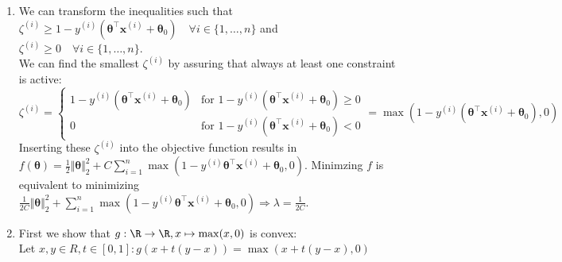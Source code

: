 \begin{enumerate}
\item We can transform the inequalities such that \\
$\zeta^{(i)} \geq 1 - y^{(i)}\left( \bm{\theta}^\top\mathbf{x}^{(i)} + \bm{\theta}_0\right) \quad \forall i \in \{1,\dots,n\}$ and $\zeta^{(i)} \geq 0 \quad \forall i \in \{1, \dots, n\}.$\\
We can find the smallest $\zeta^{(i)}$ by assuring that always at least one constraint is active:\\
$\zeta^{(i)} = \begin{cases} 1 - y^{(i)}\left( \bm{\theta}^\top\mathbf{x}^{(i)} + \bm{\theta}_0\right) & \text{for } 1 - y^{(i)}\left( \bm{\theta}^\top\mathbf{x}^{(i)} + \bm{\theta}_0\right) \geq 0 \\
0 & \text{for } 1 - y^{(i)}\left( \bm{\theta}^\top\mathbf{x}^{(i)} + \bm{\theta}_0\right) < 0
\end{cases} = \max(1 - y^{(i)}\left( \bm{\theta}^\top\mathbf{x}^{(i)} + \bm{\theta}_0\right), 0)$ \\
Inserting these $\zeta^{(i)}$ into the objective function results in $f(\bm{\theta}) =
\frac{1}{2}\Vert\bm{\theta}\Vert^2_2 + C\sum^n_{i=1}\max(1-y^{(i)}\bm{\theta}^\top\mathbf{x}^{(i)} + \bm{\theta}_0, 0).$
Minimzing $f$ is equivalent to minimizing $\frac{1}{2C}\Vert\bm{\theta}\Vert^2_2 + \sum^n_{i=1}\max(1-y^{(i)}\bm{\theta}^\top\mathbf{x}^{(i)} + \bm{\theta}_0, 0) \Rightarrow \lambda = \frac{1}{2C}.$

\item First we show that $g:\R \rightarrow \R, x \mapsto \max(x, 0)$ is convex: \\
Let $x, y \in R, t \in [0, 1]: g(x + t(y-x)) = \max(x + t(y-x), 0)$

\end{enumerate}
